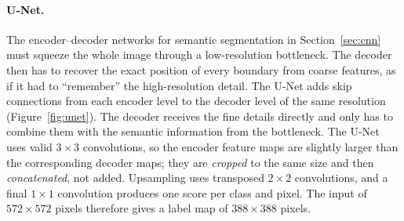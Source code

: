 \paragraph{U-Net.}
The encoder--decoder networks for semantic segmentation in Section~\ref{sec:cnn}
must squeeze the whole image through a low-resolution bottleneck. The decoder
then has to recover the exact position of every boundary from coarse features,
as if it had to ``remember'' the high-resolution detail. The U-Net adds skip
connections from each encoder level to the decoder level of the same
resolution (Figure~\ref{fig:unet}). The decoder receives the fine details
directly and only has to combine them with the semantic information from the
bottleneck. The U-Net uses valid $3\times3$ convolutions, so the encoder feature
maps are slightly larger than the corresponding decoder maps; they are
\emph{cropped} to the same size and then \emph{concatenated}, not added.
Upsampling uses transposed $2\times2$ convolutions, and a final $1\times1$
convolution produces one score per class and pixel. The input of
$572\times572$ pixels therefore gives a label map of $388\times388$ pixels.

